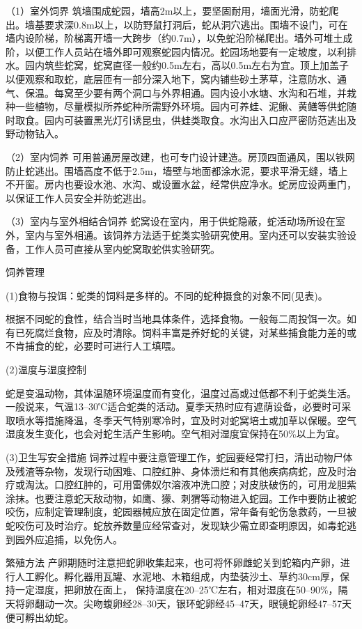 \documentclass{ctexbook}
\begin{document}
（1）室外饲界 筑墙围成蛇园，墙高2m以上，要坚固耐用，墙面光滑，防蛇爬出。墙基要求深0.8m以上，以防野鼠打洞后，蛇从洞穴逃出。围墙不设门，可在墙内设阶梯，阶梯离开墙一大跨步（约0.7m），以免蛇沿阶梯爬出。墙外可堆土成阶，以便工作人员站在墙外即可观察蛇园内情况。蛇园场地要有一定坡度，以利排水。园内筑些蛇窝，蛇窝直径一般约0.5m左右，高以0.5m左右为宜。顶上加盖子以便观察和取蛇，底层匝有一部分深入地下，窝内铺些砂土茅草，注意防水、通气、保温。每窝至少要有两个洞口与外界相通。园内设小水塘、水沟和石堆，并栽种一些植物，尽量模拟所养蛇种所需野外环境。园内可养蛙、泥鳅、黄鳝等供蛇随时取食。园内可装置黑光灯引诱昆虫，供蛙类取食。水沟出入口应严密防范逃出及野动物钻入。

（2）室内饲养 可用普通房屋改建，也可专门设计建造。房顶四面通风，围以铁网防止蛇逃出。围墙高度不低于2.5m，墙壁与地面都涂水泥，要求平滑无缝，墙上不开窗。房内也要设水池、水沟、或设置水盆，经常供应净水。蛇房应设两重门，以保证工作人员安全并防蛇逃出。

（3）室内与室外相结合饲养 蛇窝设在室内，用于供蛇隐蔽，蛇活动场所设在室外，室内与室外相通。该饲养方法适于蛇类实验研究使用。室内还可以安装实验设备，工作人员可直接从室内蛇窝取蛇供实验研究。

饲养管理

(1)食物与投饵：蛇类的饲料是多样的。不同的蛇种摄食的对象不同(见表)。
	
根据不同蛇的食性，结合当时当地具体条件，选择食物。一般每二周投饵一次。如有已死腐烂食物，应及时清除。饲料丰富是养好蛇的关键，对某些捕食能力差的或不肯捕食的蛇，必要时可进行人工填喂。

(2)温度与湿度控制 

蛇是变温动物，其体温随环境温度而有变化，温度过高或过低都不利于蛇类生活。一般说来，气温13--30℃适合蛇类的活动。夏季天热时应有遮荫设备，必要时可采取喷水等措施降温，冬季天气特别寒冷时，宜及时对蛇窝培土或加草以保暖。空气湿度发生变化，也会对蛇生活产生影响。空气相对湿度宜保持在50\%以上为宜。

(3)卫生写安全措施 饲养过程中要注意管理工作，蛇园要经常打扫，清出动物尸体及残渣等杂物，发现行动困难、口腔红肿、身体溃烂和有其他疾病病蛇，应及时治疗或淘汰。口腔红肿的，可用雷佛奴尔溶液冲洗口腔；对皮肤破伤的，可用龙胆紫涂抹。也要注意蛇天敌动物，如鹰、獴、刺猬等动物进入蛇园。工作中要防止被蛇咬伤，应制定管理制度，蛇园器械应放在固定位置，常年备有蛇伤急救药，一旦被蛇咬伤可及时治疗。蛇放养数量应经常查对，发现缺少需立即查明原因，如毒蛇逃到园外应追捕，以免伤人。

繁殖方法 产卵期随时注意把蛇卵收集起来，也可将怀卵雌蛇关到蛇箱内产卵，进行人工孵化。孵化器用瓦罐、水泥地、木箱组成，内垫装沙土、草约30cm厚，保持一定湿度，把卵放在面上， 保持温度在20--25℃左右，相对湿度在50--90\%，隔天将卵翻动一次。尖吻蝮卵经28--30天，银环蛇卵经45--47天，眼镜蛇卵经47--57天便可孵出幼蛇。
\end{document}
